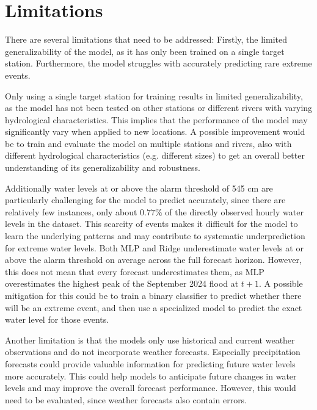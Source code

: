 \section{Limitations}


There are several limitations that need to be addressed: Firstly, the limited generalizability of the model, as it has only been trained on a single target station. Furthermore, the model struggles with accurately predicting rare extreme events.

Only using a single target station for training results in limited generalizability, as the model has not been tested on other stations or different rivers with varying hydrological characteristics. This implies that the performance of the model may significantly vary when applied to new locations. A possible improvement would be to train and evaluate the model on multiple stations and rivers, also with different hydrological characteristics (e.g. different sizes) to get an overall better understanding of its generalizability and robustness.

Additionally water levels at or above the alarm threshold of 545 cm are particularly challenging for the model to predict accurately, since there are relatively few instances, only about $0.77\%$ of the directly observed hourly water levels in the dataset. This scarcity of events makes it difficult for the model to learn the underlying patterns and may contribute to systematic underprediction for extreme water levels. Both \ac{MLP} and Ridge underestimate water levels at or above the alarm threshold on average across the full forecast horizon. However, this does not mean that every forecast underestimates them, as \ac{MLP} overestimates the highest peak of the September 2024 flood at $t+1$. A possible mitigation for this could be to train a binary classifier to predict whether there will be an extreme event, and then use a specialized model to predict the exact water level for those events.

Another limitation is that the models only use historical and current weather observations and do not incorporate weather forecasts. Especially precipitation forecasts could provide valuable information for predicting future water levels more accurately. This could help models to anticipate future changes in water levels and may improve the overall forecast performance. However, this would need to be evaluated, since weather forecasts also contain errors.

